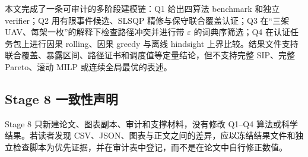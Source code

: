 本文完成了一条可审计的多阶段建模链：Q1 给出四算法 benchmark 和独立 verifier；Q2 用有限事件候选、SLSQP 精修与保守联合覆盖认证；Q3 在“三架 UAV、每架一枚”的解释下检查路径冲突并进行带 $\varepsilon$ 的词典序筛选；Q4 在认证任务包上进行因果 rolling、因果 greedy 与离线 hindsight 上界比较。结果文件支持联合覆盖、暴露区间、路径证书和调度值等定量结论，但不支持完整 SIP、完整 Pareto、滚动 MILP 或连续全局最优的表述。

\subsection{Stage 8 一致性声明}

Stage 8 只新建论文、图表副本、审计和支撑材料，没有修改 Q1--Q4 算法或科学结果。若读者发现 CSV、JSON、图表与正文之间的差异，应以冻结结果文件和独立检查脚本为优先证据，并在审计表中登记，而不是在论文中自行修正数值。

